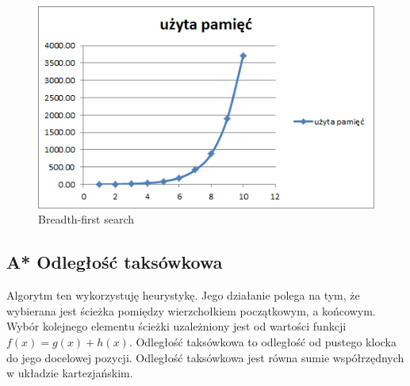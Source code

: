 \documentclass{classrep}
\begin{document}
\begin{figure}[ht]
\centering
			\includegraphics[scale=0.65]{pictures/bfs_space.png}
	\caption{Breadth-first search}
	\label{fig:Breadth-first search}
\end{figure}

  \cleardoublepage	
  \subsection{A* Odległość taksówkowa}
  Algorytm ten wykorzystuję heurystykę. Jego działanie polega na tym, że wybierana jest ścieżka pomiędzy wierzchołkiem początkowym, a końcowym. Wybór kolejnego elementu ścieżki uzależniony jest od wartości funkcji $f(x) = g(x) + h(x)$. Odległość taksówkowa to odległość od pustego klocka do jego docelowej pozycji. Odległość taksówkowa jest równa sumie współrzędnych w układzie kartezjańskim.
  
		\begin{table}
\centering
{}
\caption{A* Odleglosc taksowkowa}
\end{table}
\end{document}

